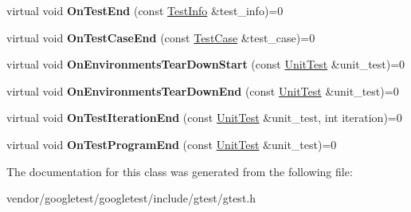 \begin{DoxyCompactItemize}
\item 
virtual void {\bfseries On\+Test\+End} (const \hyperlink{classtesting_1_1TestInfo}{Test\+Info} \&test\+\_\+info)=0\hypertarget{classtesting_1_1TestEventListener_abb1c44525ef038500608b5dc2f17099b}{}\label{classtesting_1_1TestEventListener_abb1c44525ef038500608b5dc2f17099b}

\item 
virtual void {\bfseries On\+Test\+Case\+End} (const \hyperlink{classtesting_1_1TestCase}{Test\+Case} \&test\+\_\+case)=0\hypertarget{classtesting_1_1TestEventListener_ae61985e2ef76ac78379b077be57a9c36}{}\label{classtesting_1_1TestEventListener_ae61985e2ef76ac78379b077be57a9c36}

\item 
virtual void {\bfseries On\+Environments\+Tear\+Down\+Start} (const \hyperlink{classtesting_1_1UnitTest}{Unit\+Test} \&unit\+\_\+test)=0\hypertarget{classtesting_1_1TestEventListener_a468b5e6701bcb86cb2c956caadbba5e4}{}\label{classtesting_1_1TestEventListener_a468b5e6701bcb86cb2c956caadbba5e4}

\item 
virtual void {\bfseries On\+Environments\+Tear\+Down\+End} (const \hyperlink{classtesting_1_1UnitTest}{Unit\+Test} \&unit\+\_\+test)=0\hypertarget{classtesting_1_1TestEventListener_a9ea04fa7f447865ba76df35e12ba2092}{}\label{classtesting_1_1TestEventListener_a9ea04fa7f447865ba76df35e12ba2092}

\item 
virtual void {\bfseries On\+Test\+Iteration\+End} (const \hyperlink{classtesting_1_1UnitTest}{Unit\+Test} \&unit\+\_\+test, int iteration)=0\hypertarget{classtesting_1_1TestEventListener_a550fdb3e55726e4cefa09f5697941425}{}\label{classtesting_1_1TestEventListener_a550fdb3e55726e4cefa09f5697941425}

\item 
virtual void {\bfseries On\+Test\+Program\+End} (const \hyperlink{classtesting_1_1UnitTest}{Unit\+Test} \&unit\+\_\+test)=0\hypertarget{classtesting_1_1TestEventListener_ad15b6246d94c268e233487a86463ef3d}{}\label{classtesting_1_1TestEventListener_ad15b6246d94c268e233487a86463ef3d}

\end{DoxyCompactItemize}


The documentation for this class was generated from the following file\+:\begin{DoxyCompactItemize}
\item 
vendor/googletest/googletest/include/gtest/gtest.\+h\end{DoxyCompactItemize}
